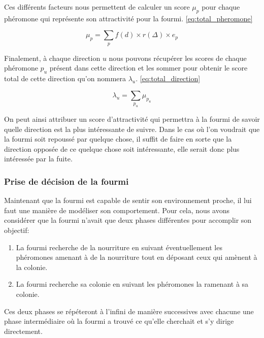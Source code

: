 \documentclass{EPUProjetDi}
\begin{document}
Ces différents facteurs nous permettent de calculer un score $\mu_{p}$ pour chaque phéromone qui représente 
son attractivité pour la fourmi. \eqref{eq:total_pheromone}

\begin{equation}
    \mu_{p} = \sum_{p}{} f(d) \times r(\Delta) \times e_{p}
    \label{eq:total_pheromone}
\end{equation}

Finalement, à chaque direction $u$ nous pouvons récupérer les scores de chaque phéromone $p_{u}$ présent dans cette direction
et les sommer pour obtenir le score total de cette direction qu'on nommera $\lambda_{u}$. \eqref{eq:total_direction}

\begin{equation}
    \lambda_{u} = \sum_{p_{u}}{} \mu_{p_{u}}
    \label{eq:total_direction}
\end{equation}

On peut ainsi attribuer un score d'attractivité qui permettra à la fourmi de savoir quelle direction est la plus intéressante de suivre.
Dans le cas où l'on voudrait que la fourmi soit repoussé par quelque chose, il suffit de faire en sorte que la direction opposée de ce quelque chose
soit intéressante, elle serait donc plus intéressée par la fuite. 

\subsubsection{Prise de décision de la fourmi}

Maintenant que la fourmi est capable de sentir son environnement proche, il lui faut une manière de modéliser son comportement.
Pour cela, nous avons considérer que la fourmi n'avait que deux phases différentes pour accomplir son objectif:
\begin{enumerate}
    \item La fourmi recherche de la nourriture en suivant éventuellement les phéromones amenant à de la nourriture tout en déposant ceux qui amènent à la colonie.
    \item La fourmi recherche sa colonie en suivant les phéromones la ramenant à sa colonie.
\end{enumerate}

Ces deux phases se répéteront à l'infini de manière successives avec chacune une phase intermédiaire où la fourmi a trouvé ce qu'elle cherchait
et s'y dirige directement. 

\pagebreak
\end{document}
